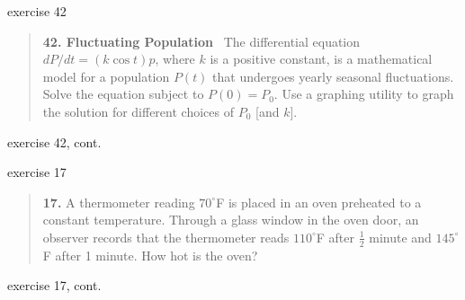 \documentclass[colorlinks]{beamer}
\begin{document}
\begin{frame}{exercise 42}

\small
\begin{quotation}
\noindent \textbf{42.  Fluctuating Population} \, The differential equation $dP/dt = (k \cos t) p$, where $k$ is a positive constant, is a mathematical model for a population $P(t)$ that undergoes yearly seasonal fluctuations.  Solve the equation subject to $P(0)=P_0$.  Use a graphing utility to graph the solution for different choices of $P_0$ [and $k$]. 
\end{quotation}

\vspace{45mm}
\end{frame}


\begin{frame}{exercise 42, cont.}

\vspace{30mm}

\hfill %
\end{frame}


\begin{frame}{exercise 17}

\small
\begin{quotation}
\noindent \textbf{17.} A thermometer reading $70^\circ$F is placed in an oven preheated to a constant temperature.  Through a glass window in the oven door, an observer records that the thermometer reads $110^\circ$F after $\frac{1}{2}$ minute and $145^\circ$F after 1 minute.  How hot is the oven?
\end{quotation}

\vspace{50mm}
\end{frame}


\begin{frame}{exercise 17, cont.}

\vspace{20mm}

\hfill %
\end{frame}
\end{document}
